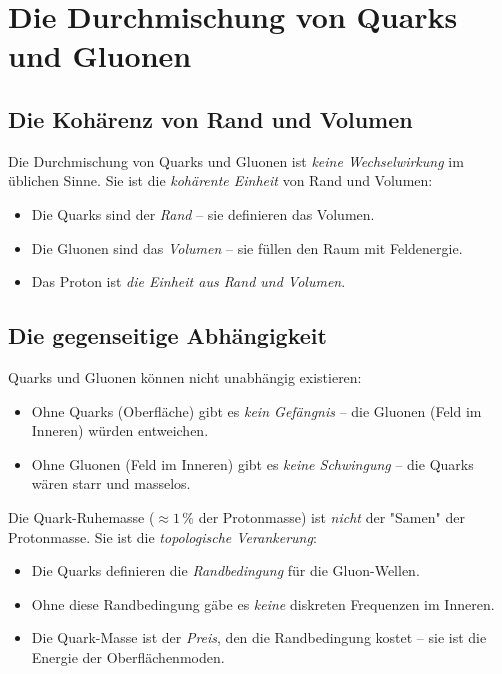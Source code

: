 \documentclass[11pt,a4paper]{article}
\begin{document}
	\section{Die Durchmischung von Quarks und Gluonen}
	
	\subsection{Die Kohärenz von Rand und Volumen}
	
	Die Durchmischung von Quarks und Gluonen ist \emph{keine Wechselwirkung} im üblichen Sinne. 
	Sie ist die \emph{kohärente Einheit} von Rand und Volumen:
	
	\begin{itemize}
		\item Die Quarks sind der \emph{Rand} -- sie definieren das Volumen.
		\item Die Gluonen sind das \emph{Volumen} -- sie füllen den Raum mit Feldenergie.
		\item Das Proton ist \emph{die Einheit aus Rand und Volumen}.
	\end{itemize}
	
	\subsection{Die gegenseitige Abhängigkeit}
	
	Quarks und Gluonen können nicht unabhängig existieren:
	\begin{itemize}
		\item Ohne Quarks (Oberfläche) gibt es \emph{kein Gefängnis} -- die Gluonen (Feld im Inneren) würden entweichen.
		\item Ohne Gluonen (Feld im Inneren) gibt es \emph{keine Schwingung} -- die Quarks wären starr und masselos.
	\end{itemize}
	
	Die Quark-Ruhemasse (\(\approx 1\,\%\) der Protonmasse) ist \emph{nicht} der "Samen" der Protonmasse. 
	Sie ist die \emph{topologische Verankerung}:
	\begin{itemize}
		\item Die Quarks definieren die \emph{Randbedingung} für die Gluon-Wellen.
		\item Ohne diese Randbedingung gäbe es \emph{keine} diskreten Frequenzen im Inneren.
		\item Die Quark-Masse ist der \emph{Preis}, den die Randbedingung kostet -- sie ist die Energie der Oberflächenmoden.
	\end{itemize}
	
\end{document}

